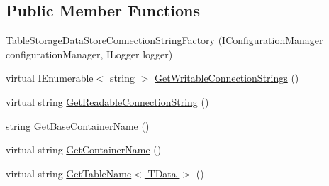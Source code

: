 \subsection*{Public Member Functions}
\begin{DoxyCompactItemize}
\item 
\hyperlink{classCqrs_1_1Azure_1_1BlobStorage_1_1DataStores_1_1TableStorageDataStoreConnectionStringFactory_a45eeda7a13a9c45b2b0f6e5c89ee0d25_a45eeda7a13a9c45b2b0f6e5c89ee0d25}{Table\+Storage\+Data\+Store\+Connection\+String\+Factory} (\hyperlink{interfaceCqrs_1_1Configuration_1_1IConfigurationManager}{I\+Configuration\+Manager} configuration\+Manager, I\+Logger logger)
\item 
virtual I\+Enumerable$<$ string $>$ \hyperlink{classCqrs_1_1Azure_1_1BlobStorage_1_1DataStores_1_1TableStorageDataStoreConnectionStringFactory_a65b6f404ac2434c6366af73a22e914d1_a65b6f404ac2434c6366af73a22e914d1}{Get\+Writable\+Connection\+Strings} ()
\item 
virtual string \hyperlink{classCqrs_1_1Azure_1_1BlobStorage_1_1DataStores_1_1TableStorageDataStoreConnectionStringFactory_a0bdcd6f6d273a225c3ebcd6aa9386b95_a0bdcd6f6d273a225c3ebcd6aa9386b95}{Get\+Readable\+Connection\+String} ()
\item 
string \hyperlink{classCqrs_1_1Azure_1_1BlobStorage_1_1DataStores_1_1TableStorageDataStoreConnectionStringFactory_a03239d850e3fd95cd1507780425a7c94_a03239d850e3fd95cd1507780425a7c94}{Get\+Base\+Container\+Name} ()
\item 
virtual string \hyperlink{classCqrs_1_1Azure_1_1BlobStorage_1_1DataStores_1_1TableStorageDataStoreConnectionStringFactory_aa1f5d2a17524e6438ad87e60cbaf6f23_aa1f5d2a17524e6438ad87e60cbaf6f23}{Get\+Container\+Name} ()
\item 
virtual string \hyperlink{classCqrs_1_1Azure_1_1BlobStorage_1_1DataStores_1_1TableStorageDataStoreConnectionStringFactory_ac992c8d5387ddf5965cc661f1b85a721_ac992c8d5387ddf5965cc661f1b85a721}{Get\+Table\+Name$<$ T\+Data $>$} ()
\end{DoxyCompactItemize}
